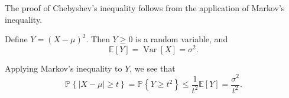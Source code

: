 \documentclass[12pt]{article}
\newcommand{\Prob}[2]{\mathbb{P}_{#1}\left\{#2\right\}}
\newcommand{\Expect}{\mathbb{E}}
\begin{document}
The proof of Chebyshev's inequality follows from the application of Markov's inequality.

Define $Y = (X - \mu)^2$.  Then $Y \ge 0$ is a random variable, and $$\Expect[Y] = \operatorname{Var}[X] = \sigma^2.$$

Applying Markov's inequality to $Y$, we see that $$\Prob{}{\left|X - \mu \right| \ge t} = \Prob{}{Y \ge t^2} \le \frac{1}{t^2}\Expect[Y] = \frac{\sigma^2}{t^2}.$$
\end{document}
